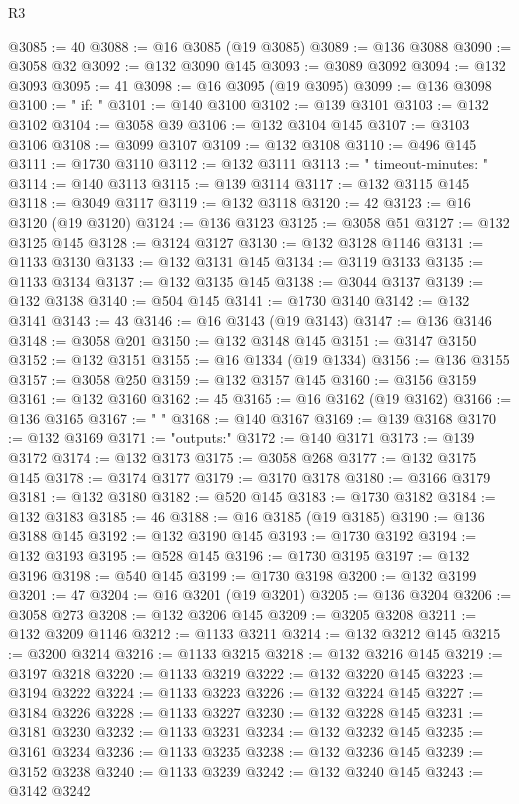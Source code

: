 \begin{lexlean}{R3}
\begin{coremodule}
@3085 := 40
@3088 := @16 @3085 (@19 @3085)
@3089 := @136 @3088
@3090 := @3058 @32
@3092 := @132 @3090 @145
@3093 := @3089 @3092
@3094 := @132 @3093
@3095 := 41
@3098 := @16 @3095 (@19 @3095)
@3099 := @136 @3098
@3100 := "    if: "
@3101 := @140 @3100
@3102 := @139 @3101
@3103 := @132 @3102
@3104 := @3058 @39
@3106 := @132 @3104 @145
@3107 := @3103 @3106
@3108 := @3099 @3107
@3109 := @132 @3108
@3110 := @496 @145
@3111 := @1730 @3110
@3112 := @132 @3111
@3113 := "    timeout-minutes: "
@3114 := @140 @3113
@3115 := @139 @3114
@3117 := @132 @3115 @145
@3118 := @3049 @3117
@3119 := @132 @3118
@3120 := 42
@3123 := @16 @3120 (@19 @3120)
@3124 := @136 @3123
@3125 := @3058 @51
@3127 := @132 @3125 @145
@3128 := @3124 @3127
@3130 := @132 @3128 @1146
@3131 := @1133 @3130
@3133 := @132 @3131 @145
@3134 := @3119 @3133
@3135 := @1133 @3134
@3137 := @132 @3135 @145
@3138 := @3044 @3137
@3139 := @132 @3138
@3140 := @504 @145
@3141 := @1730 @3140
@3142 := @132 @3141
@3143 := 43
@3146 := @16 @3143 (@19 @3143)
@3147 := @136 @3146
@3148 := @3058 @201
@3150 := @132 @3148 @145
@3151 := @3147 @3150
@3152 := @132 @3151
@3155 := @16 @1334 (@19 @1334)
@3156 := @136 @3155
@3157 := @3058 @250
@3159 := @132 @3157 @145
@3160 := @3156 @3159
@3161 := @132 @3160
@3162 := 45
@3165 := @16 @3162 (@19 @3162)
@3166 := @136 @3165
@3167 := "    "
@3168 := @140 @3167
@3169 := @139 @3168
@3170 := @132 @3169
@3171 := "outputs:"
@3172 := @140 @3171
@3173 := @139 @3172
@3174 := @132 @3173
@3175 := @3058 @268
@3177 := @132 @3175 @145
@3178 := @3174 @3177
@3179 := @3170 @3178
@3180 := @3166 @3179
@3181 := @132 @3180
@3182 := @520 @145
@3183 := @1730 @3182
@3184 := @132 @3183
@3185 := 46
@3188 := @16 @3185 (@19 @3185)
@3190 := @136 @3188 @145
@3192 := @132 @3190 @145
@3193 := @1730 @3192
@3194 := @132 @3193
@3195 := @528 @145
@3196 := @1730 @3195
@3197 := @132 @3196
@3198 := @540 @145
@3199 := @1730 @3198
@3200 := @132 @3199
@3201 := 47
@3204 := @16 @3201 (@19 @3201)
@3205 := @136 @3204
@3206 := @3058 @273
@3208 := @132 @3206 @145
@3209 := @3205 @3208
@3211 := @132 @3209 @1146
@3212 := @1133 @3211
@3214 := @132 @3212 @145
@3215 := @3200 @3214
@3216 := @1133 @3215
@3218 := @132 @3216 @145
@3219 := @3197 @3218
@3220 := @1133 @3219
@3222 := @132 @3220 @145
@3223 := @3194 @3222
@3224 := @1133 @3223
@3226 := @132 @3224 @145
@3227 := @3184 @3226
@3228 := @1133 @3227
@3230 := @132 @3228 @145
@3231 := @3181 @3230
@3232 := @1133 @3231
@3234 := @132 @3232 @145
@3235 := @3161 @3234
@3236 := @1133 @3235
@3238 := @132 @3236 @145
@3239 := @3152 @3238
@3240 := @1133 @3239
@3242 := @132 @3240 @145
@3243 := @3142 @3242

\end{coremodule}
\end{lexlean}
